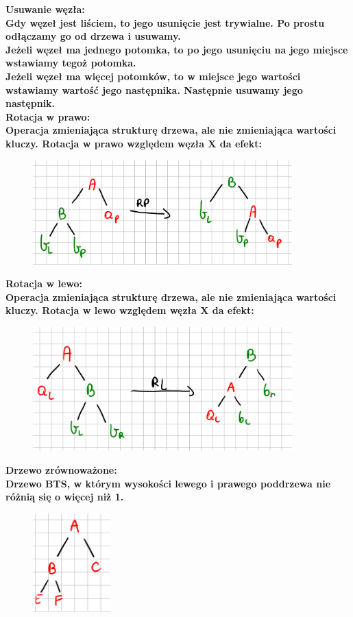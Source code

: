 \documentclass[a4paper,12pt]{article}
\newcommand{\h}[1]{\noindent \bf #1 \rm \\ \noindent}
\begin{document}
\h{Usuwanie węzła:}
Gdy węzeł jest liściem, to jego usunięcie jest trywialne. Po prostu odłączamy go od drzewa i usuwamy.\\

\noindent
Jeżeli węzeł ma jednego potomka, to po jego usunięciu na jego miejsce wstawiamy tegoż potomka.\\

\noindent
Jeżeli węzeł ma więcej potomków, to w miejsce jego wartości wstawiamy wartość jego następnika. Następnie usuwamy jego następnik.\\

\h{Rotacja w prawo:}
Operacja zmieniająca strukturę drzewa, ale nie zmieniająca wartości kluczy. Rotacja w prawo względem węzła X da efekt:
\begin{figure}[H]
	\centering
	\includegraphics[width=10cm]{fig5.png}
\end{figure}

\newpage
\h{Rotacja w lewo:}
Operacja zmieniająca strukturę drzewa, ale nie zmieniająca wartości kluczy. Rotacja w lewo względem węzła X da efekt:
\begin{figure}[H]
	\centering
	\includegraphics[width=10cm]{fig6.png}
\end{figure}

\h{Drzewo zrównoważone:}
Drzewo BTS, w którym wysokości lewego i prawego poddrzewa nie różnią się o więcej niż 1.
\begin{figure}[H]
	\centering
	\includegraphics[width=3cm]{fig7.png}
\end{figure}
\end{document}
